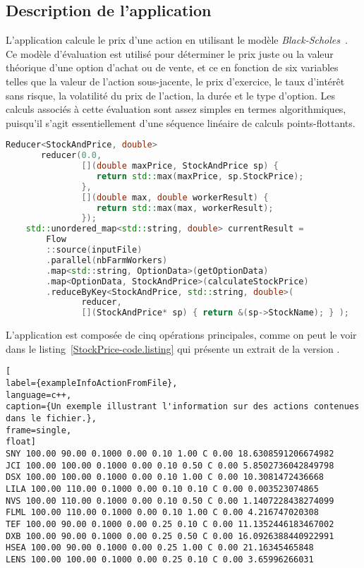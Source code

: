 \subsection{Description de l'application}

L'application  calcule le prix d'une action en utilisant le modèle \emph{Black-Scholes}~\citep{macbeth1979empirical}. Ce mod\`ele d'\'evaluation est utilis\'e pour d\'eterminer le prix juste ou la valeur th\'eorique d'une option d'achat ou de vente, et ce en fonction de six variables telles que la valeur de l'action sous-jacente, le prix d'exercice, le taux d'int\'er\^et sans risque, la volatilit\'e du prix de l'action, la dur\'ee et le type d'option. 
%
Les calculs associés à cette évaluation sont assez simples en termes
algorithmiques, puisqu'il s'agit essentiellement d'une séquence
linéaire de calculs points-flottants.

\begin{lstlisting}[float,label={StockPrice-code.listing},gobble=4,basicstyle=\ttfamily\footnotesize,language=c++,caption={Un extrait du code de \TT{StockPrice.cpp} (version \ppff).},frame=single]
    Reducer<StockAndPrice, double>
       reducer(0.0, 
               [](double maxPrice, StockAndPrice sp) {
                  return std::max(maxPrice, sp.StockPrice);
               },
               [](double max, double workerResult) { 
                  return std::max(max, workerResult);
               });
    std::unordered_map<std::string, double> currentResult =
        Flow
        ::source(inputFile)
        .parallel(nbFarmWorkers)
        .map<std::string, OptionData>(getOptionData)
        .map<OptionData, StockAndPrice>(calculateStockPrice)
        .reduceByKey<StockAndPrice, std::string, double>(
               reducer, 
               [](StockAndPrice* sp) { return &(sp->StockName); } );
\end{lstlisting}


L'application  est compos\'ee de cinq op\'erations principales, comme on peut le voir dans le listing~\ref{StockPrice-code.listing} qui présente un extrait de la version \ppff.

\begin{lstlisting}[
label={exampleInfoActionFromFile},
language=c++,
caption={Un exemple illustrant l'information sur des actions contenues dans le fichier.},
frame=single,
float]
SNY 100.00 90.00 0.1000 0.00 0.10 1.00 C 0.00 18.6308591206674982
JCI 100.00 100.00 0.1000 0.00 0.10 0.50 C 0.00 5.8502736042849798
DSX 100.00 100.00 0.1000 0.00 0.10 1.00 C 0.00 10.3081472436668
LILA 100.00 110.00 0.1000 0.00 0.10 0.10 C 0.00 0.003523074865
NVS 100.00 110.00 0.1000 0.00 0.10 0.50 C 0.00 1.1407228438274099
FLML 100.00 110.00 0.1000 0.00 0.10 1.00 C 0.00 4.216747020308
TEF 100.00 90.00 0.1000 0.00 0.25 0.10 C 0.00 11.1352446183467002
DXB 100.00 90.00 0.1000 0.00 0.25 0.50 C 0.00 16.0926388440922991
HSEA 100.00 90.00 0.1000 0.00 0.25 1.00 C 0.00 21.16345465848
LENS 100.00 100.00 0.1000 0.00 0.25 0.10 C 0.00 3.65996266031
\end{lstlisting}


